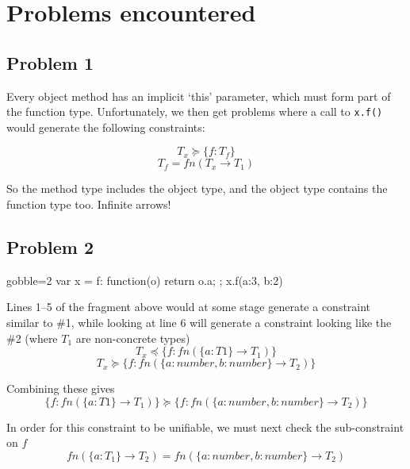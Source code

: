 \documentclass{article}
\begin{document}
\newcommand{\question}[1]{\colchunk{\begin{description}\item[Q:]{#1}%
    \end{description}}}
\newcommand{\answer}[1]{\colchunk{\begin{description}\item[A:]{#1}%
    \end{description}}\colplacechunks}

\section{Problems encountered}

\subsection*{Problem 1}
	
	Every object method has an implicit `this' parameter, which must form part
	of the function type. Unfortunately, we then get problems where a call to
	\texttt{x.f()} would generate the following constraints:

	$$ T_x \succeq \{f:T_f\}$$
	$$ T_f = fn (T_x \rightarrow T_1)$$

	So the method type includes the object type, and the object type contains
	the function type too. Infinite arrows!

\subsection*{Problem 2}

	\begin{jscode*}{gobble=2}
		var x = {
			f: function(o) {
				return o.a;
			}
		};
		x.f({a:3, b:2})
	\end{jscode*}

	Lines 1--5 of the fragment above would at some stage generate a constraint
	similar to \#1, while looking at line 6 will generate a constraint looking
	like the \#2 (where $T_1$ are non-concrete types)
	$$T_x \preceq \{f:fn(\{a:T1\} \rightarrow T_1 ) \} $$
	$$T_x \succeq{} \{f:fn(\{a:number,b:number\} \rightarrow T_2 ) \} $$

	Combining these gives
	$$\{f:fn(\{a:T1\} \rightarrow T_1)\} \succeq \{f:fn(\{a:number,b:number\} \rightarrow T_2 ) \} $$

	In order for this constraint to be unifiable, we must next check the sub-constraint
	on $f$
	$$fn(\{a:T_1\} \rightarrow T_2) = fn(\{a:number,b:number\} \rightarrow
	T_2)$$
\end{document}
